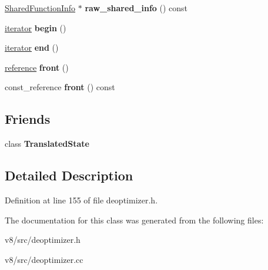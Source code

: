\begin{DoxyCompactItemize}
\mbox{\hyperlink{classv8_1_1internal_1_1SharedFunctionInfo}{Shared\+Function\+Info}} $\ast$ {\bfseries raw\+\_\+shared\+\_\+info} () const
\item 
\mbox{\label{classv8_1_1internal_1_1TranslatedFrame_ab8fe3880b57f7f14f4ebfd907dfeb723}} 
\mbox{\hyperlink{classv8_1_1internal_1_1TranslatedFrame_1_1iterator}{iterator}} {\bfseries begin} ()
\item 
\mbox{\label{classv8_1_1internal_1_1TranslatedFrame_a045d000f672509ec860ed19e309ec800}} 
\mbox{\hyperlink{classv8_1_1internal_1_1TranslatedFrame_1_1iterator}{iterator}} {\bfseries end} ()
\item 
\mbox{\label{classv8_1_1internal_1_1TranslatedFrame_a10dbd5e39f866cfebdd40ec9afd15ec6}} 
\mbox{\hyperlink{classv8_1_1internal_1_1TranslatedValue}{reference}} {\bfseries front} ()
\item 
\mbox{\label{classv8_1_1internal_1_1TranslatedFrame_a138abdc5b6e20dcce454438c7b05e076}} 
const\+\_\+reference {\bfseries front} () const
\end{DoxyCompactItemize}
\subsection*{Friends}
\begin{DoxyCompactItemize}
\item 
\mbox{\label{classv8_1_1internal_1_1TranslatedFrame_a93214c289745cbbfea7af56c3a474a3b}} 
class {\bfseries Translated\+State}
\end{DoxyCompactItemize}


\subsection{Detailed Description}


Definition at line 155 of file deoptimizer.\+h.



The documentation for this class was generated from the following files\+:\begin{DoxyCompactItemize}
\item 
v8/src/deoptimizer.\+h\item 
v8/src/deoptimizer.\+cc\end{DoxyCompactItemize}
